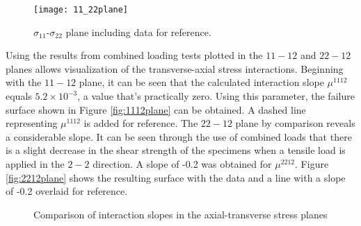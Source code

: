 \documentclass[main.tex]{subfiles}
\begin{document}
\begin{figure}[h]
	\center
	\texttt{[image: 11\_22plane]}
	\captionsetup{justification=centering} %
	\caption[failure envelope in the $\sigma_{11}$-$\sigma_{22}$ plane]{$\sigma_{11}$-$\sigma_{22}$ plane including data for reference.} \label{fig:1122plane}
\end{figure}

\pagebreak

Using the results from combined loading tests plotted in the $11-12$ and $22-12$ planes allows visualization of the transverse-axial stress interactions. Beginning with the $11-12$ plane, it can be seen that the calculated interaction slope $\mu^{1112}$ equals $5.2\times 10^{-3}$, a value that's practically zero. Using this parameter, the failure surface shown in Figure \ref{fig:1112plane} can be obtained. A dashed line representing $\mu^{1112}$ is added for reference. The $22-12$ plane by comparison reveals a considerable slope. It can be seen through the use of combined loads that there is a slight decrease in the shear strength of the specimens when a tensile load is applied in the $2-2$ direction. A slope of -0.2 was obtained for $\mu^{2212}$. Figure \ref{fig:2212plane} shows the resulting surface with the data and a line with a slope of -0.2 overlaid for reference.

\pagebreak

\begin{figure}[!htbp]
	\center
	\linebreak
	\caption{Comparison of interaction slopes in the axial-transverse stress planes} \label{fig:SSIcomp}
\end{figure}
\end{document}
